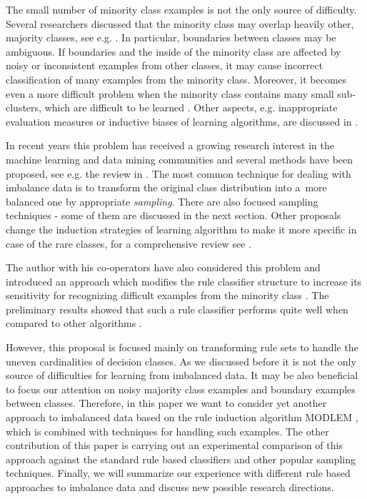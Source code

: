 \documentclass{AIMeth05}
\begin{document}
The small number of  minority class examples is not the only source of
difficulty.  Several researchers discussed that the minority class may
overlap heavily other, majority classes, see e.g. \cite{KubMat,Lav}. In
particular, boundaries between classes may be ambiguous. If boundaries and
the inside of the minority class are affected by noisy or inconsistent
examples from other classes, it may cause incorrect classification of many
examples from the minority class. Moreover, it becomes even a more difficult
problem when the minority class contains many small sub-clusters, which are
difficult to be learned \cite{jap}. Other aspects, e.g. inappropriate
evaluation measures or inductive biases of learning algorithms, are
discussed in \cite{Gary}.

In recent years this problem has received a growing research interest in the
machine learning and data mining communities and several methods have been
proposed, see e.g. the review in \cite{Gary}. The most common technique for
dealing with imbalance data is to transform the original class distribution
into a~more balanced one by appropriate {\em sampling}. There are also
focused sampling techniques  - some of them are discussed in the next
section. Other proposals change the induction strategies of learning
algorithm to make it more specific in case of the rare classes, for a
comprehensive review see \cite{Gary}.

The author with his co-operators have also considered this problem and
introduced an approach which modifies the rule classifier structure to
increase its sensitivity for recognizing difficult examples from the
minority class \cite{GrzymJSW,StefWilk}. The preliminary results showed that
such a rule classifier performs quite well when compared to other algorithms
\cite{GrzymJSW}.

However, this proposal is focused mainly on transforming rule sets to handle
the uneven cardinalities of decision classes. As we discussed before it is
not the only source of difficulties for learning from imbalanced data. It
may be also beneficial to focus our attention on  noisy majority class
examples and  boundary examples between classes. Therefore, in this paper we
want to consider yet another approach to imbalanced data based on the rule
induction algorithm MODLEM \cite{Stef01hab}, which is combined with
techniques for handling such examples. The other contribution of this paper
is carrying out an experimental comparison of this approach against the
standard rule based classifiers and other popular sampling techniques.
Finally, we will summarize our experience with different rule based
approaches to imbalance data and discuss new possible research directions.
\end{document}
